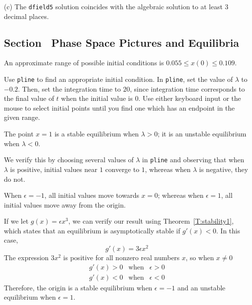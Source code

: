 \documentclass{ximera}
\begin{document}
(c) The {\tt dfield5} solution coincides with the algebraic solution to at
least 3 decimal places.

\begin{figure}[htb]
                       \centerline{%
                       }
\end{figure}



\subsection*{Section~\protect{\ref{S:PSP&E}} Phase Space Pictures and Equilibria}

\ans An approximate range of possible initial conditions is
$0.055 \leq x(0) \leq 0.109$. 

\soln Use {\tt pline} to find an appropriate initial condition.
In {\tt pline}, set the value of $\lambda$ to $-0.2$.  Then, set the
integration time to $20$, since integration time corresponds to the
final value of $t$ when the initial value is $0$.  Use either
keyboard input or the mouse to select initial points until you
find one which has an endpoint in the given range. 

\ans The point $x = 1$ is a stable equilibrium when $\lambda > 0$; it is
an unstable equilibrium when $\lambda < 0$. 

\soln We verify this by choosing several values of $\lambda$ in
{\tt pline} and observing that when $\lambda$ is positive, initial values
near $1$ converge to $1$, whereas when $\lambda$ is negative, they do not.

\ans When $\epsilon = -1$, all initial values move towards $x = 0$; whereas
when $\epsilon = 1$, all initial values move away from the origin. 

\soln If we let $g(x) = \epsilon x^3$, we can verify our result using
Theorem~\ref{T:stability1}, which states
that an equilibrium is asymptotically stable if $g'(x) < 0$.  In this case,
\[
g'(x) = 3\epsilon x^2
\]
The expression $3x^2$ is positive for all nonzero real numbers $x$, so
when $x \neq 0$
\[ \begin{array}{ccc}
g'(x) > 0 & \mbox{when} & \epsilon > 0 \\
g'(x) < 0 & \mbox{when} & \epsilon < 0 \end{array}
\]
Therefore, the origin is a stable equilibrium when $\epsilon = -1$ and
an unstable equilibrium when $\epsilon = 1$.
\end{document}
